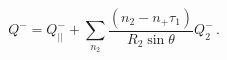 \begin{equation}
Q^-=Q^-_{||}+\sum_{n_2} \frac{(n_2-n_+\tau_1)}{R_2\sin\theta} Q^-_2\,.
\end{equation}

